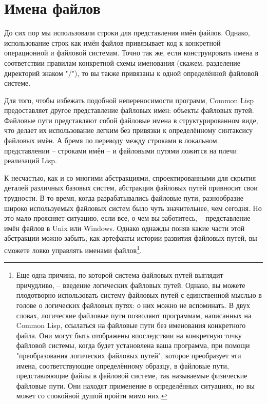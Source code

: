 \section{Имена файлов}

До сих пор мы использовали строки для представления имён файлов. Однако, использование
строк как имён файлов привязывает код к конкретной операционной и файловой системам. Точно
так же, если конструировать имена в соответствии правилам конкретной схемы именования
(скажем, разделение директорий знаком "/"), то вы также привязаны к одной определённой
файловой системе.

Для того, чтобы избежать подобной непереносимости программ, Common Lisp предоставляет
другое представление файловых имен: объекты файловых путей. Файловые пути представляют
собой файловые имена в структурированном виде, что делает их использование легким без
привязки к определённому синтаксису файловых имён. А бремя по переводу между строками в
локальном представлении -- строками имён -- и файловыми путями ложится на плечи реализаций
Lisp.

К несчастью, как и со многими абстракциями, спроектированными для скрытия деталей
различных базовых систем, абстракция файловых путей привносит свои трудности. В то время,
когда разрабатывались файловые пути, разнообразие широко используемых файловых систем было
чуть значительнее, чем сегодня. Но это мало проясняет ситуацию, если все, о чем вы
заботитесь, -- представление имён файлов в Unix или Windows. Однако однажды поняв какие
части этой абстракции можно забыть, как артефакты истории развития файловых путей, вы
сможете ловко управлять именами файлов\footnote{Еще одна причина, по которой система
  файловых путей выглядит причудливо, -- введение логических файловых путей. Однако, вы
  можете плодотворно использовать систему файловых путей с единственной мыслью в голове о
  логических файловых путях: о них можно не вспоминать. В двух словах, логические файловые
  пути позволяют программам, написанных на Common Lisp, ссылаться на файловые пути без
  именования конкретного файла. Они могут быть отображены впоследствии на конкретную точку
  файловой системы, когда будет установлена ваша программа, при помощи "преобразования
  логических файловых путей", которое преобразует эти имена, соответствующие определённому
  образцу, в файловые пути, представляющие файлы в файловой системе, так называемые
  физические файловые пути. Они находят применение в определённых ситуациях, но вы может
  со спокойной душой пройти мимо них.}.

